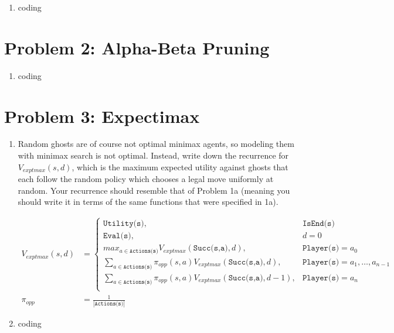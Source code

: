 \documentclass[10pt]{article}
\begin{document}
\begin{enumerate}[label=(\alph*)]
  \item coding

\end{enumerate}

\section*{\normalsize Problem 2: Alpha-Beta Pruning}

\begin{enumerate}[label=(\alph*)]

  \item coding

\end{enumerate}

\section*{\normalsize Problem 3: Expectimax}

\begin{enumerate}[label=(\alph*)]

  \item Random ghosts are of course not optimal minimax agents, so modeling them with minimax search is not optimal. Instead, write down the recurrence for $V_{exptmax}(s,d)$, which is the maximum expected utility against ghosts that each follow the random policy which chooses a legal move uniformly at random. Your recurrence should resemble that of Problem 1a (meaning you should write it in terms of the same functions that were specified in 1a).
  
  \begin{align*}
  V_{exptmax}(s,d) &= \begin{cases}
  \texttt{Utility(s)}, &\texttt{IsEnd(s)}\\
  \texttt{Eval(s)}, &d = 0\\
  max_{a \in \texttt{Actions(s)}}V_{exptmax}(\texttt{Succ(s,a)},d), &\texttt{Player(s)} = a_0\\
  \sum_{a \in \texttt{Actions(s)}}\pi_{opp}(s,a)V_{exptmax}(\texttt{Succ(s,a)},d), &\texttt{Player(s)} = a_1, \dots, a_{n-1}\\
  \sum_{a \in \texttt{Actions(s)}}\pi_{opp}(s,a)V_{exptmax}(\texttt{Succ(s,a)},d-1), &\texttt{Player(s)} = a_n\\
  \end{cases}\\ 
  \pi_{opp} &= \frac{1}{|\texttt{Actions(s)}|}
  \end{align*}
  
  \item coding
		
\end{enumerate}
\end{document}
